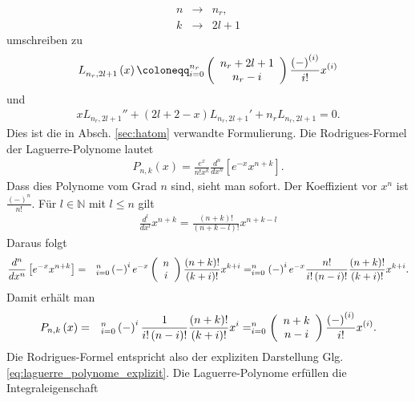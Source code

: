 \documentclass{book}
\let\sum\relax
\DeclareMathOperator*{\sum}{\raisebox{-3.5pt}{\scalebox{2}{\rotatebox{1}{{\bask Σ}}}}}
\begin{document}
%
\begin{eqnarray}
n&\to&n_r,\\
k&\to&2l + 1
\end{eqnarray}
%
umschreiben zu
%
\begin{eqnarray}
L_{n_r, 2l + 1}^{}\left(x\right) \coloneqq \sum_{i = 0}^{n_r}\left(\begin{array}{c}
n_r + 2l + 1\\
n_r - i
\end{array}\right)\frac{\left(-\right)^{(i)}}{i!}x^{(i)}
\end{eqnarray}
%
und
%
\begin{eqnarray}
xL_{n_r, 2l + 1}'' + \left(2l + 2 - x\right)L_{n_r, 2l + 1}' + n_rL_{n_r, 2l + 1} = 0.
\end{eqnarray}
%
Dies ist die in Absch. \ref{sec:hatom} verwandte Formulierung. Die Rodrigues-Formel der Laguerre-Polynome lautet
%
\begin{eqnarray}
P_{n, k}\left(x\right) = \frac{e^x}{n!x^k}\frac{d^n}{dx^n}\left[e^{-x}x^{n + k}\right].
\end{eqnarray}
%
Dass dies Polynome vom Grad $n$ sind, sieht man sofort. Der Koeffizient vor $x^n$ ist $\frac{\left(-\right)^n}{n!}$. Für $l\in\mathbb{N}$ mit $l\leq n$ gilt
%
\begin{eqnarray}
\frac{d^l}{dx^l}x^{n + k} = \frac{\left(n + k\right)!}{\left(n + k - l\right)!}x^{n + k - l}
\end{eqnarray}
%
Daraus folgt
%
\begin{eqnarray}
\frac{d^n}{dx^n}\left[e^{-x}x^{n + k}\right] & = & \sum_{i = 0}^{n}\left(-\right)^{i}e^{-x}\left(\begin{array}{c}
n\\
i
\end{array}\right)\frac{\left(n + k\right)!}{\left(k + i\right)!}x^{k + i} = \sum_{i = 0}^{n}\left(-\right)^{i}e^{-x}\frac{n!}{i!\left(n - i\right)!}\frac{\left(n + k\right)!}{\left(k + i\right)!}x^{k + i}.
\end{eqnarray}
%
Damit erhält man
%
\begin{eqnarray}
P_{n, k}\left(x\right) & = & \sum_{i = 0}^{n}\left(-\right)^{i}\frac{1}{i!\left(n - i\right)!}\frac{\left(n + k\right)!}{\left(k + i\right)!}x^{i} = \sum_{i = 0}^{n}\left(\begin{array}{c}
n + k\\
n - i
\end{array}\right)\frac{\left(-\right)^{(i)}}{i!}x^{(i)}.
\end{eqnarray}
%
Die Rodrigues-Formel entspricht also der expliziten Darstellung Glg. \eqref{eq:laguerre_polynome_explizit}. Die Laguerre-Polynome erfüllen die Integraleigenschaft
\end{document}
